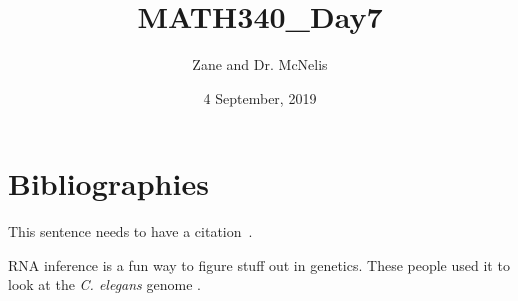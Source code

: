 \documentclass{article}
\title{MATH340\_Day7}
\author{Zane and Dr. McNelis}
\date{4 September, 2019}
\begin{document}
\nocite{*} %

\maketitle

\section{Bibliographies}


This sentence needs to have a citation~\cite{fakebook}. %

RNA inference is a fun way to figure stuff out in genetics. These people used it to look at the \textit{C. elegans} genome \cite{kamath2003systematic}.


\end{document}
